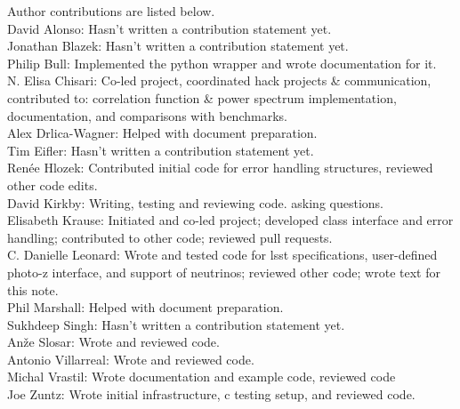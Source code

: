 Author contributions are listed below. \\
David Alonso: Hasn't written a contribution statement yet. \\
Jonathan Blazek: Hasn't written a contribution statement yet. \\
Philip Bull: Implemented the python wrapper and wrote documentation for it. \\
N. Elisa Chisari: Co-led project, coordinated hack projects \& communication, contributed to: correlation function \& power spectrum implementation, documentation, and comparisons with benchmarks. \\
Alex Drlica-Wagner: Helped with document preparation. \\
Tim Eifler: Hasn't written a contribution statement yet. \\
Ren\'ee Hlozek: Contributed initial code for error handling structures, reviewed other code edits. \\
David Kirkby: Writing, testing and reviewing code. asking questions. \\
Elisabeth Krause: Initiated and co-led project; developed class interface and error handling; contributed to other code; reviewed pull requests. \\
C. Danielle Leonard: Wrote and tested code for lsst specifications, user-defined photo-z interface, and support of neutrinos; reviewed other code; wrote text for this note. \\
Phil Marshall: Helped with document preparation. \\
Sukhdeep Singh: Hasn't written a contribution statement yet. \\
An\v{z}e Slosar: Wrote and reviewed code. \\
Antonio Villarreal: Wrote and reviewed code. \\
Michal Vrastil: Wrote documentation and example code, reviewed code \\
Joe Zuntz: Wrote initial infrastructure, c testing setup, and reviewed code. \\
